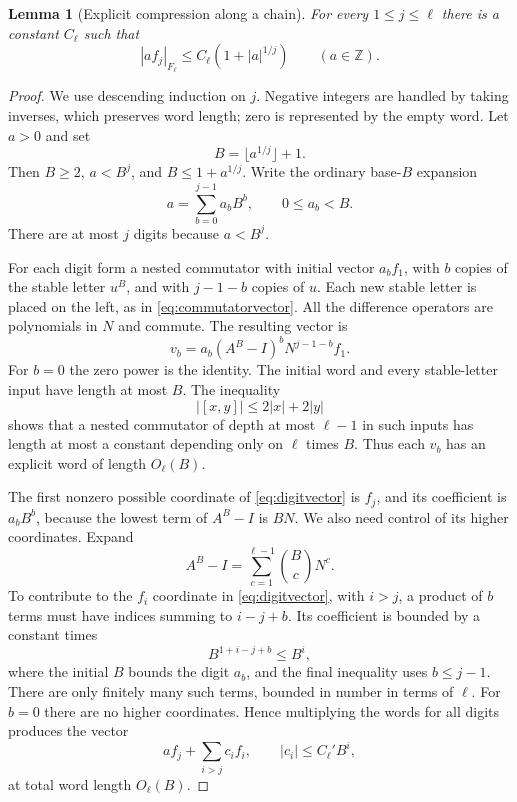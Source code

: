 \documentclass[11pt]{article}
\numberwithin{equation}{section}
\newtheorem{lemma}[theorem]{Lemma}
\theoremstyle{definition}
\theoremstyle{remark}
\newcommand{\Z}{\mathbb Z}
\begin{document}
\begin{lemma}[Explicit compression along a chain]\label{lem:standardcompression}
For every $1\le j\le\ell$ there is a constant $C_\ell$ such that
\begin{equation}\label{eq:standardcompression}
|a f_j|_{F_\ell}\le C_\ell(1+|a|^{1/j})\qquad(a\in\Z).
\end{equation}
\end{lemma}
\begin{proof}
We use descending induction on $j$. Negative integers are handled by taking inverses, which preserves word length; zero is represented by the empty word. Let $a>0$ and set
\[
B=\lfloor a^{1/j}\rfloor+1.
\]
Then $B\ge2$, $a<B^j$, and $B\le1+a^{1/j}$. Write the ordinary base-$B$ expansion
\begin{equation}\label{eq:baseB}
a=\sum_{b=0}^{j-1}a_b B^b,\qquad 0\le a_b<B.
\end{equation}
There are at most $j$ digits because $a<B^j$.

For each digit form a nested commutator with initial vector $a_b f_1$, with $b$ copies of the stable letter $u^B$, and with $j-1-b$ copies of $u$. Each new stable letter is placed on the left, as in \eqref{eq:commutatorvector}. All the difference operators are polynomials in $N$ and commute. The resulting vector is
\begin{equation}\label{eq:digitvector}
v_b=a_b(A^B-I)^b N^{j-1-b}f_1.
\end{equation}
For $b=0$ the zero power is the identity. The initial word and every stable-letter input have length at most $B$. The inequality
\[
|[x,y]|\le2|x|+2|y|
\]
shows that a nested commutator of depth at most $\ell-1$ in such inputs has length at most a constant depending only on $\ell$ times $B$. Thus each $v_b$ has an explicit word of length $O_\ell(B)$.

The first nonzero possible coordinate of \eqref{eq:digitvector} is $f_j$, and its coefficient is $a_bB^b$, because the lowest term of $A^B-I$ is $BN$. We also need control of its higher coordinates. Expand
\[
A^B-I=\sum_{c=1}^{\ell-1}\binom Bc N^c.
\]
To contribute to the $f_i$ coordinate in \eqref{eq:digitvector}, with $i>j$, a product of $b$ terms must have indices summing to $i-j+b$. Its coefficient is bounded by a constant times
\[
B^{1+i-j+b}\le B^i,
\]
where the initial $B$ bounds the digit $a_b$, and the final inequality uses $b\le j-1$. There are only finitely many such terms, bounded in number in terms of $\ell$. For $b=0$ there are no higher coordinates. Hence multiplying the words for all digits produces the vector
\begin{equation}\label{eq:errorvector}
a f_j+\sum_{i>j}c_i f_i,\qquad |c_i|\le C_\ell' B^i,
\end{equation}
at total word length $O_\ell(B)$.


\end{proof}
\end{document}
